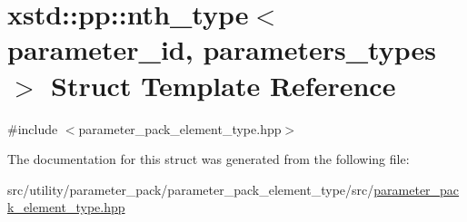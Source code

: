 \hypertarget{structxstd_1_1pp_1_1nth__type}{\section{xstd\-:\-:pp\-:\-:nth\-\_\-type$<$ parameter\-\_\-id, parameters\-\_\-types $>$ Struct Template Reference}
\label{structxstd_1_1pp_1_1nth__type}
}


{\ttfamily \#include $<$parameter\-\_\-pack\-\_\-element\-\_\-type.\-hpp$>$}



The documentation for this struct was generated from the following file\-:\begin{DoxyCompactItemize}
\item 
src/utility/parameter\-\_\-pack/parameter\-\_\-pack\-\_\-element\-\_\-type/src/\hyperlink{parameter__pack__element__type_8hpp}{parameter\-\_\-pack\-\_\-element\-\_\-type.\-hpp}\end{DoxyCompactItemize}

